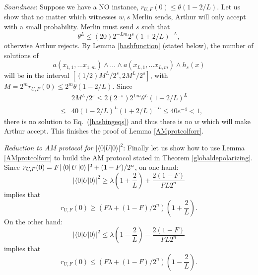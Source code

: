 \noindent \textit{Soundness}:   Suppose we have a NO instance, $r_{U, F}(0) \leq \theta (1 - 2/L)$. Let us show that no matter which witnesses $w, s$ Merlin sends, Arthur will only accept with a small probability. Merlin must send $s$ such that 
\begin{equation}
\theta^L \leq (20) 2^{-Lm}  2^{s} (1+2/L)^{-L},
\end{equation}
otherwise Arthur rejects. By Lemma \ref{hashfunction} (stated below), the number of solutions of
\begin{equation} \label{hashingeqs}
a(x_{1, 1}, \ldots x_{1, m}) \wedge \ldots \wedge a(x_{L, 1}, \ldots x_{L, m})  \wedge h_s(x) 
\end{equation}
will be in the interval $[(1/2) M^L/2^s, 2  M^L/2^s]$, with $M = 2^m r_{U, F}(0) \leq 2^m \theta (1 - 2/L)$. Since 
\begin{eqnarray}
&& 2 M^L/2^s \leq 2 (2^{-s}) 2^{Lm} \theta^L  (1 - 2/L)^{L} \nonumber \\ 
&\leq& 40 (1 - 2/L)^{L} (1 + 2/L)^{-L}  \leq 40 e^{-4} < 1,
\end{eqnarray}
there is no solution to Eq.~(\ref{hashingeqs}) and thus there is no $w$ which will make Arthur accept. This finishes the proof of Lemma \ref{AMprotcolforr}. 

\vspace{0.3 cm}

\noindent \textit{Reduction to AM protocol for $|\langle 0 | U | 0 \rangle|^2$}: Finally let us show how to use Lemma \ref{AMprotcolforr} to build the AM protocol stated in Theorem \ref{globaldepolarizing}. Since $r_{U, F}(0) = F |\mathinner{\langle{0}|}U\mathinner{|{0}\rangle}|^2 + (1 - F)/2^n$, on one hand:
\begin{equation} \label{alternative1}
|\langle 0 | U | 0 \rangle|^2 \geq   \lambda \left(1 + \frac{2}{L}  \right)  +  \frac{2(1 - F)}{F L2^n}  
\end{equation}
implies that 
\begin{equation}
r_{U, F}(0) \geq   \left( F \lambda + (1 - F)/2^n   \right) \left(1 + \frac{2}{L}  \right).
\end{equation}
On the other hand:
\begin{equation} \label{alternative2}
|\langle 0 | U | 0 \rangle|^2 \leq \lambda \left(1 - \frac{2}{L}  \right)  -  \frac{2(1 - F)}{F L 2^n}  
\end{equation}
implies that 
\begin{equation}
r_{U, F}(0) \leq   \left(  F \lambda + (1 - F)/2^n   \right) \left(1 - \frac{2}{L}  \right).
\end{equation}

